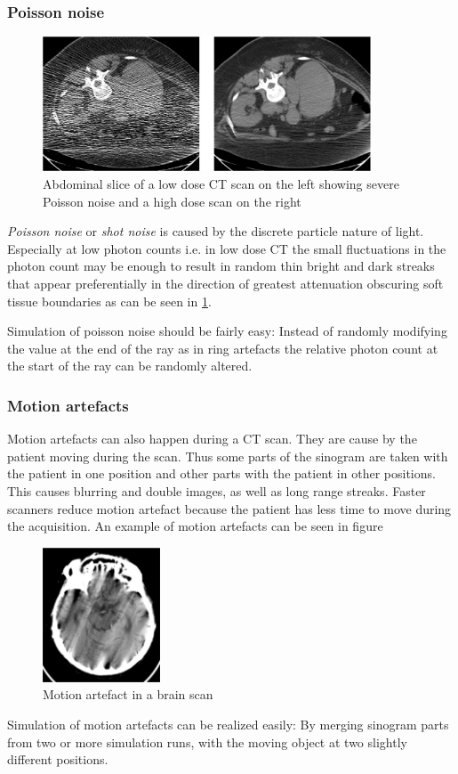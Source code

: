 \subsubsection{Poisson noise}
\begin{figure}[h!]
	\centering
	\includegraphics[height=4cm]{images/poisson.png}
	\caption{Abdominal slice of a low dose CT scan on the left showing severe Poisson noise and a high dose scan on the right\cite{CausesAndReductionTechniques}}
	\label{poissonNoise}
\end{figure}
\par \emph{Poisson noise} or \emph{shot noise} is caused by the discrete particle nature of light. Especially at low photon counts i.e. in low dose CT the small fluctuations in the photon count may be enough to result in random thin bright and dark streaks that appear preferentially in the direction of greatest attenuation obscuring soft tissue boundaries as can be seen in \ref{poissonNoise}.\cite{CausesAndReductionTechniques}
\par Simulation of poisson noise should be fairly easy: Instead of randomly modifying the value at the end of the ray as in ring artefacts the relative photon count at the start of the ray can be randomly altered.
\subsubsection{Motion artefacts}
\par Motion artefacts can also happen during a CT scan. They are cause by the patient moving during the scan. Thus some parts of the sinogram are taken with the patient in one position and other parts with the patient in other positions. This causes blurring and double images, as well as long range streaks. Faster scanners reduce motion artefact because the patient has less time to move during the acquisition. An example of motion artefacts can be seen in figure
\begin{figure}[h!]
	\centering
	\includegraphics[height=4cm]{images/motion.png}
	\caption{Motion artefact in a brain scan\cite{CausesAndReductionTechniques}}
	\label{motion}
\end{figure}
\par Simulation of motion artefacts can be realized easily: By merging sinogram parts from two or more simulation runs, with the moving object at two slightly different positions.\cite{deMan}

